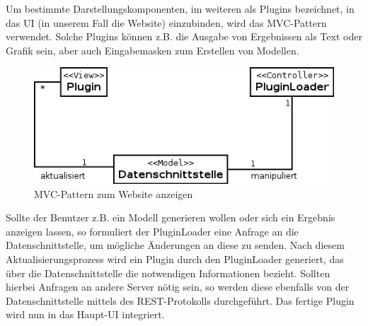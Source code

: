 
Um bestimmte Darstellungskomponenten, im weiteren als Plugins bezeichnet, in das UI (in unserem Fall die Website) einzubinden, wird das MVC-Pattern verwendet. Solche Plugins können z.B. die Ausgabe von Ergebnissen als Text oder Grafik sein, aber auch Eingabemasken zum Erstellen von Modellen. 

\begin{figure}[h]
\centering
\includegraphics[width=0.6\linewidth]{Grafik/Diagramm/Pattern/MVC/Kontextdiagramm.png}
\caption[MVC Website Klassen]{MVC-Pattern zum Website anzeigen}
\end{figure}

\noindent Sollte der Benutzer z.B. ein Modell generieren wollen oder sich ein Ergebnis anzeigen lassen, so formuliert der PluginLoader eine Anfrage an die Datenschnittstelle, um mögliche Änderungen an diese zu senden. Nach diesem Aktualisierungsprozess wird ein Plugin durch den PluginLoader generiert, das über die Datenschnittstelle die notwendigen Informationen bezieht. Sollten hierbei Anfragen an andere Server nötig sein, so werden diese ebenfalls von der Datenschnittstelle mittels des REST-Protokolls durchgeführt. Das fertige Plugin wird nun in das Haupt-UI integriert.


